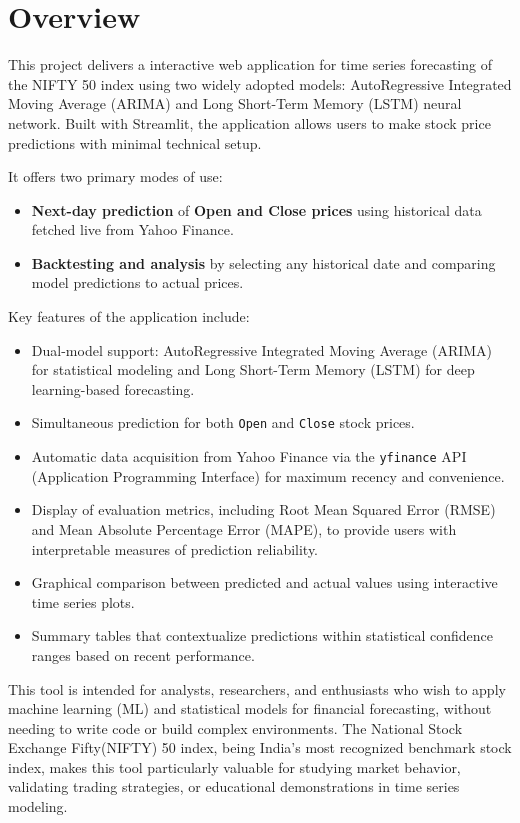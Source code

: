 %
%
%



\chapter{Overview}

This project delivers a interactive web application for time series forecasting of the NIFTY 50 index using two widely adopted models: AutoRegressive Integrated Moving Average (ARIMA) and Long Short-Term Memory (LSTM) neural network. Built with Streamlit, the application allows users to make stock price predictions with minimal technical setup.

It offers two primary modes of use:
\begin{itemize}
	\item \textbf{Next-day prediction} of \textbf{Open and Close prices} using historical data fetched live from Yahoo Finance.
	\item \textbf{Backtesting and analysis} by selecting any historical date and comparing model predictions to actual prices.
\end{itemize}

Key features of the application include:
\begin{itemize}
	\item Dual-model support: AutoRegressive Integrated Moving Average (ARIMA) for statistical modeling and Long Short-Term Memory (LSTM) for deep learning-based forecasting.
	\item Simultaneous prediction for both \texttt{Open} and \texttt{Close} stock prices.
	\item Automatic data acquisition from Yahoo Finance via the \texttt{yfinance} API (Application Programming Interface) for maximum recency and convenience.
	\item Display of evaluation metrics, including Root Mean Squared Error (RMSE) and Mean Absolute Percentage Error (MAPE), to provide users with interpretable measures of prediction reliability.
	\item Graphical comparison between predicted and actual values using interactive time series plots.
	\item Summary tables that contextualize predictions within statistical confidence ranges based on recent performance.
\end{itemize}

This tool is intended for analysts, researchers, and enthusiasts who wish to apply machine learning (ML) and statistical models for financial forecasting, without needing to write code or build complex environments. The National Stock Exchange Fifty(NIFTY) 50 index, being India’s most recognized benchmark stock index, makes this tool particularly valuable for studying market behavior, validating trading strategies, or educational demonstrations in time series modeling.
